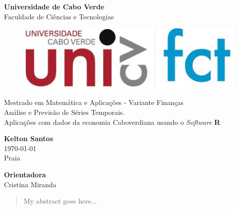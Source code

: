 \begin{titlepage}
\begin{center}
\LARGE{\textbf{Universidade de Cabo Verde}}\\
\normalsize{Faculdade de Ciências e Tecnologias}\\[0.3cm]

\begin{figure}[h!]
    \centering
    \includegraphics[width=.3\linewidth]{img/hpi_logo.jpg}
\end{figure}
\vspace{4cm}

\LARGE{Mestrado em Matemática e Aplicações - Variante Finanças}\\[0.7cm]
\Huge{Análise e Previsão de Séries Temporais.\\ Aplicações com dados da economia Caboverdiana usando o \textit{Software} \textbf{R}}

\vspace{3cm} 

\Large{\textbf{Kelton Santos}} \\[3pt]  
\vspace{0.5cm}
\large{\today} \\
Praia

\vspace{1cm}

\large{\textbf{Orientadora}}\\
Cristina Miranda\\
\vspace{0.5cm}
\end{center}
\end{titlepage}


\thispagestyle{empty}


\begin{abstract}
My abstract goes here...
\end{abstract}

% 
% 

\setcounter{page}{1}
